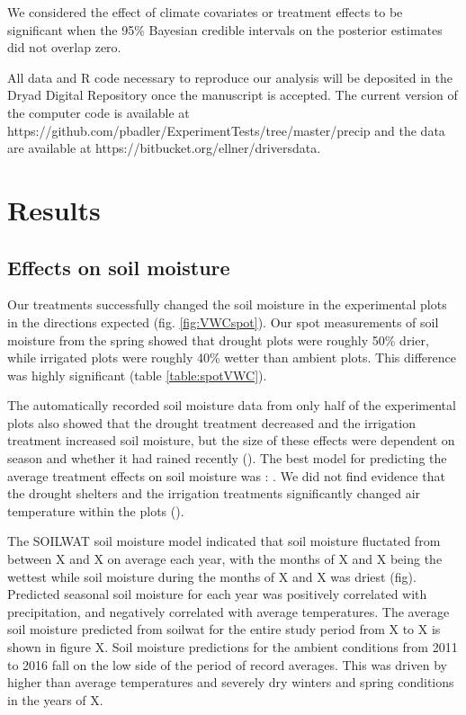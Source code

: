 \documentclass[11pt]{article}
\begin{document}
\begin{doublespacing}
We considered the effect of climate covariates or treatment effects to be significant when the 95\% Bayesian credible intervals on the posterior estimates did not overlap zero.  

All data and R code necessary to reproduce our analysis will be deposited in the Dryad Digital Repository once the manuscript is accepted. The current version of the computer code is available at https://github.com/pbadler/ExperimentTests/tree/master/precip and the data are available at https://bitbucket.org/ellner/driversdata. 

\section*{Results}

\subsection*{Effects on soil moisture}

Our treatments successfully changed the soil moisture in the experimental plots in the directions expected (fig. \ref{fig:VWCspot}). Our spot measurements of soil moisture from the spring showed that drought plots were roughly 50\% drier, while irrigated plots were roughly 40\% wetter than ambient plots. This difference was highly significant (table \ref{table:spotVWC}).
  
The automatically recorded soil moisture data from only half of the experimental plots also showed that the drought treatment decreased and the irrigation treatment increased soil moisture, but the size of these effects were dependent on season and whether it had rained recently (). The best model for predicting the average treatment effects on soil moisture was : .  We did not find evidence that the drought shelters and the irrigation treatments significantly changed air temperature within the plots ().  

The SOILWAT soil moisture model indicated that soil moisture fluctated from between X and X on average each year, with the months of X and X being the wettest while soil moisture during the months of X and X was driest (fig). Predicted seasonal soil moisture for each year was positively correlated with precipitation, and negatively correlated with average temperatures. The average soil moisture predicted from soilwat for the entire study period from X to X is shown in figure X.  Soil moisture predictions for the ambient conditions from 2011 to 2016 fall on the low side of the period of record averages.  This was driven by higher than average temperatures and severely dry winters and spring conditions in the years of X. 


\end{doublespacing}
\end{document}
